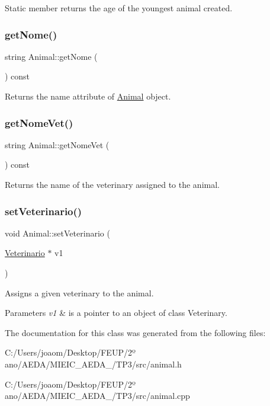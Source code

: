 Static member returns the age of the youngest animal created. \mbox{\label{class_animal_a16dab693b54ccdb94ead24d703f6d5a6}} 
\subsubsection{\texorpdfstring{get\+Nome()}{getNome()}}
{\footnotesize\ttfamily string Animal\+::get\+Nome (\begin{DoxyParamCaption}{ }\end{DoxyParamCaption}) const}

Returns the name attribute of \mbox{\hyperlink{class_animal}{Animal}} object. \mbox{\label{class_animal_a03cbd88b0804573f4957b28fc24b55d3}} 
\subsubsection{\texorpdfstring{get\+Nome\+Vet()}{getNomeVet()}}
{\footnotesize\ttfamily string Animal\+::get\+Nome\+Vet (\begin{DoxyParamCaption}{ }\end{DoxyParamCaption}) const}

Returns the name of the veterinary assigned to the animal. \mbox{\label{class_animal_aafcfbc37499b51a1e2a80263b3a65fac}} 
\subsubsection{\texorpdfstring{set\+Veterinario()}{setVeterinario()}}
{\footnotesize\ttfamily void Animal\+::set\+Veterinario (\begin{DoxyParamCaption}\item[{\mbox{\hyperlink{class_veterinario}{Veterinario}} $\ast$}]{v1 }\end{DoxyParamCaption})}

Assigns a given veterinary to the animal. 
\begin{DoxyParams}{Parameters}
{\em v1} & is a pointer to an object of class Veterinary. \\
\hline
\end{DoxyParams}


The documentation for this class was generated from the following files\+:\begin{DoxyCompactItemize}
\item 
C\+:/\+Users/joaom/\+Desktop/\+F\+E\+U\+P/2º ano/\+A\+E\+D\+A/\+M\+I\+E\+I\+C\+\_\+\+A\+E\+D\+A\+\_/\+T\+P3/src/animal.\+h\item 
C\+:/\+Users/joaom/\+Desktop/\+F\+E\+U\+P/2º ano/\+A\+E\+D\+A/\+M\+I\+E\+I\+C\+\_\+\+A\+E\+D\+A\+\_/\+T\+P3/src/animal.\+cpp\end{DoxyCompactItemize}
